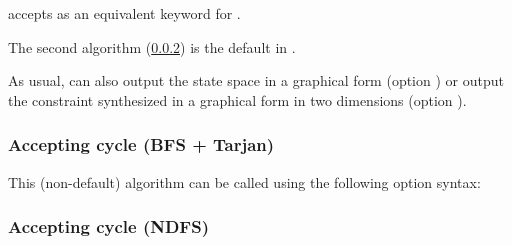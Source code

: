 
\begin{syntaxalias}
	\imitator{} accepts  as an equivalent keyword for .
\end{syntaxalias}



The second algorithm (\cref{sss:accepting-loop-NDFS}) is the default in \imitator{}.


As usual, \imitator{} can also
output the state space in a graphical form (option )
or
output the constraint synthesized in a graphical form in two dimensions (option ).


\subsubsection{Accepting cycle (BFS + Tarjan)}\label{sss:accepting-loop-BFS}

This (non-default) algorithm can be called using the following option syntax:



\subsubsection{Accepting cycle (NDFS)}\label{sss:accepting-loop-NDFS}


